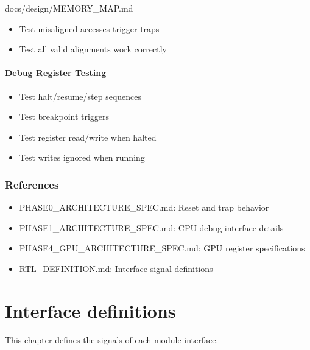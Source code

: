 \begin{relocated}{docs/design/MEMORY_MAP.md}
\begin{itemize}
\tightlist
\item
  Test misaligned accesses trigger traps
\item
  Test all valid alignments work correctly
\end{itemize}

\subsubsection{Debug Register Testing}\label{ds:mm:memory-map:debug-register-testing}

\begin{itemize}
\tightlist
\item
  Test halt/\allowbreak{}resume/\allowbreak{}step sequences
\item
  Test breakpoint triggers
\item
  Test register read/\allowbreak{}write when halted
\item
  Test writes ignored when running
\end{itemize}

\subsection{References}\label{ds:mm:memory-map:references}

\begin{itemize}
\tightlist
\item
  PHASE0\_\allowbreak{}ARCHITECTURE\_\allowbreak{}SPEC.md: Reset and
  trap behavior
\item
  PHASE1\_\allowbreak{}ARCHITECTURE\_\allowbreak{}SPEC.md: CPU debug
  interface details
\item
  PHASE4\_\allowbreak{}GPU\_\allowbreak{}ARCHITECTURE\_\allowbreak{}SPEC.md:
  GPU register specifications
\item
  RTL\_\allowbreak{}DEFINITION.md: Interface signal definitions
\end{itemize}
\end{relocated}

\chapter{Interface definitions}\label{ds:ch:interface-definitions}

This chapter defines the signals of each module interface.

